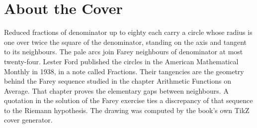 \backmatter
\cleardoublepage
\chapter*{About the Cover}
\noindent Reduced fractions of denominator up to eighty each carry a circle whose radius is one over twice the square of the denominator, standing on the axis and tangent to its neighbours. The pale arcs join Farey neighbours of denominator at most twenty-four. Lester Ford published the circles in the American Mathematical Monthly in 1938, in a note called Fractions. Their tangencies are the geometry behind the Farey sequence studied in the chapter Arithmetic Functions on Average. That chapter proves the elementary gaps between neighbours. A quotation in the solution of the Farey exercise ties a discrepancy of that sequence to the Riemann hypothesis. The drawing was computed by the book's own TikZ cover generator.
